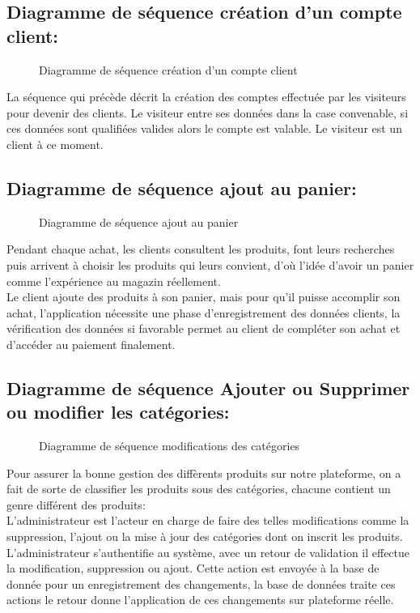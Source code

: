 \documentclass[a4paper]{report}
\begin{document}
\begin{doublespace}
	\subsection{Diagramme de séquence création d'un compte
	client:}
	\begin{figure}[H]
		\begin{center}
			\caption{Diagramme de séquence création d'un compte
			client}
		\end{center}
	\end{figure}
	La séquence  qui précède décrit la création des comptes
	effectuée par les visiteurs pour devenir des clients. Le visiteur entre ses
	données dans la case convenable, si ces données sont qualifiées valides alors
	le compte est valable. Le visiteur est un client à ce moment.
	\subsection{Diagramme de séquence ajout au panier:}
	\begin{figure}[H]
		\begin{center}
			\caption{Diagramme de séquence ajout au panier}
		\end{center}
	\end{figure}
	Pendant chaque achat, les clients consultent les produits,
	font leurs recherches puis arrivent à choisir les produits qui leurs convient,
	d'où l'idée d'avoir un panier comme l'expérience au magazin réellement. \\Le
	client ajoute des produits à son panier, mais pour qu'il puisse accomplir son
	achat, l'application nécessite une phase d'enregistrement des données clients,
	la vérification des données si favorable permet au client de compléter son
	achat et d'accéder au paiement finalement.
	
	\subsection{Diagramme de séquence Ajouter ou Supprimer ou
	modifier les catégories:}
	\begin{figure}[H]
		\begin{center}
			\caption{Diagramme de séquence modifications des
			catégories}
		\end{center}
	\end{figure}
	Pour assurer la bonne gestion des diffèrents produits sur
	notre plateforme, on a fait de sorte de classifier les produits sous des
	catégories, chacune contient un genre différent des produits:\\
	L'administrateur est l'acteur en charge de faire des telles modifications comme
	la suppression, l'ajout ou la mise à jour des catégories dont on inscrit les
	produits. L'administrateur s'authentifie au système, avec un retour de
	validation il effectue la modification, suppression ou ajout. Cette action est
	envoyée à la base de donnée pour un enregistrement des changements, la base de
	données traite ces actions le retour donne l'application de ces changements sur
	plateforme réelle.

\end{doublespace}
\end{document}

